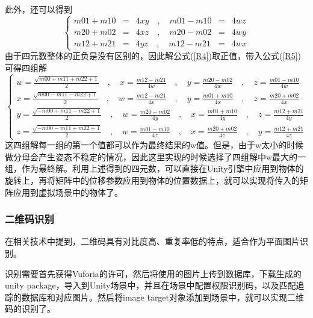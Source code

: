 此外，还可以得到
\begin{equation}\label{R5}
\left\{
\begin{aligned}
m01 + m10 &=& 4xy  \quad\mathrm{,}\quad m01 - m10 &=& 4wz \\
m20 + m02 &=& 4xz  \quad\mathrm{,}\quad m20 - m02 &=& 4wy \\
m12 + m21 &=& 4yz  \quad\mathrm{,}\quad m12 - m21 &=& 4wx 
\end{aligned}
\right.
\end{equation}
由于四元数整体的正负是没有区别的，因此解公式(\ref{R4})取正值，带入公式(\ref{R5})可得四组解
\begin{equation}\label{R6}
\left\{
\begin{aligned}
w=\frac{\sqrt{m00 + m11 + m22 + 1}}{2} \quad\mathrm{,}\quad x = \frac{m12 - m21}{4w} \quad\mathrm{,}\quad y = \frac{m20 - m02}{4w} \quad\mathrm{,}\quad z = \frac{m01 - m10}{4w}\\
x=\frac{\sqrt{m00 - m11 - m22 + 1}}{2} \quad\mathrm{,}\quad w = \frac{m12 - m21}{4x} \quad\mathrm{,}\quad y = \frac{m01 + m10}{4x} \quad\mathrm{,}\quad z = \frac{m20 + m02}{4x}\\
y=\frac{\sqrt{-m00 + m11 - m22 + 1}}{2} \quad\mathrm{,}\quad w = \frac{m20 - m02}{4y} \quad\mathrm{,}\quad x = \frac{m01 + m10}{4y} \quad\mathrm{,}\quad z = \frac{m12 + m21}{4y}\\
z=\frac{\sqrt{-m00 - m11 + m22 + 1}}{2} \quad\mathrm{,}\quad w = \frac{m01 - m10}{4z} \quad\mathrm{,}\quad x = \frac{m20 + m02}{4z} \quad\mathrm{,}\quad y = \frac{m12 + m21}{4z}
\end{aligned}
\right.
\end{equation}
这四组解每一组的第一个值都可以作为最终结果的w值。但是，由于w太小的时候做分母会产生姿态不稳定的情况\cite{akenine2018real}，因此这里实现的时候选择了四组解中w最大的一组，作为最终解。利用上述得到的四元数，可以直接在Unity引擎中应用到物体的旋转上，再将矩阵中的位移参数应用到物体的位置数据上，就可以实现将传入的矩阵应用到虚拟场景中的物体了。

\subsubsection{二维码识别}
在相关技术中提到，二维码具有对比度高、重复率低的特点，适合作为平面图片识别。

识别需要首先获得Vuforia的许可，然后将使用的图片上传到数据库，下载生成的unity package，导入到Unity场景中，并且在场景中配置权限识别码，以及匹配追踪的数据库和对应图片。然后将image target对象添加到场景中，就可以实现二维码的识别了。

